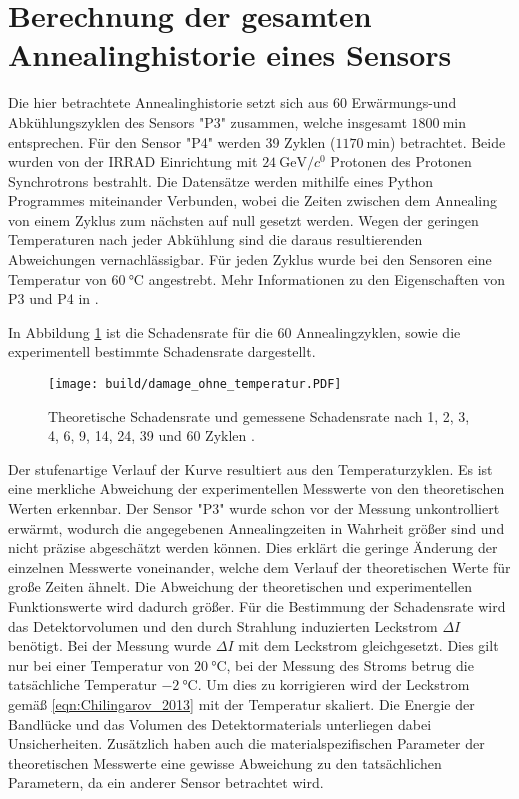 \section{Berechnung der gesamten Annealinghistorie eines Sensors}
Die hier betrachtete Annealinghistorie setzt sich aus 60 Erwärmungs-und
Abkühlungszyklen des Sensors "P3" zusammen, welche insgesamt $\SI{1800}{\minute}$ entsprechen.
Für den Sensor "P4" werden 39 Zyklen ($\SI{1170}{\minute}$) betrachtet.
Beide wurden von der ${\mathrm{IRRAD}}$ Einrichtung mit $\SI{24}{\giga\eV\per\clight}$ Protonen des Protonen Synchrotrons bestrahlt.
Die Datensätze werden mithilfe eines Python Programmes miteinander Verbunden,
wobei die Zeiten zwischen dem Annealing von einem Zyklus zum nächsten auf null gesetzt werden. Wegen der geringen
Temperaturen nach jeder Abkühlung sind die daraus resultierenden Abweichungen vernachlässigbar.
Für jeden Zyklus wurde bei den Sensoren eine Temperatur von $\SI{60}{\celsius}$ angestrebt.
Mehr Informationen zu den Eigenschaften von P3 und P4 in  \cite{felix}.


In Abbildung \ref{fig:P_3} ist die Schadensrate für die 60 Annealingzyklen,
sowie die experimentell bestimmte Schadensrate dargestellt.

\begin{figure}
  \centering
    \texttt{[image: build/damage\_ohne\_temperatur.PDF]}
\caption{Theoretische Schadensrate und gemessene Schadensrate nach 1, 2, 3, 4, 6, 9, 14, 24, 39 und 60 Zyklen .}
\label{fig:P_3}
\end{figure}

Der stufenartige Verlauf der Kurve resultiert aus den Temperaturzyklen.
Es ist eine merkliche Abweichung der experimentellen Messwerte von den theoretischen
Werten erkennbar. Der Sensor "P3" wurde schon vor der Messung unkontrolliert erwärmt, wodurch
die angegebenen Annealingzeiten in Wahrheit größer sind und nicht präzise abgeschätzt werden können. Dies erklärt die
geringe Änderung der einzelnen Messwerte voneinander, welche dem
Verlauf der theoretischen Werte für große Zeiten ähnelt. Die Abweichung der theoretischen
und experimentellen Funktionswerte wird dadurch größer.
Für die Bestimmung der Schadensrate wird das Detektorvolumen und den durch
Strahlung induzierten Leckstrom $\Delta I$ benötigt. Bei der Messung wurde
$\Delta I$ mit dem Leckstrom gleichgesetzt. Dies gilt nur bei einer Temperatur
von $\SI{20}{\celsius}$, bei der Messung des Stroms betrug die tatsächliche Temperatur
$\SI{-2}{\celsius}$. Um dies zu korrigieren wird der Leckstrom gemäß \ref{eqn:Chilingarov_2013}
mit der Temperatur skaliert. Die Energie der Bandlücke und das Volumen des Detektormaterials
unterliegen dabei Unsicherheiten. Zusätzlich haben auch die materialspezifischen Parameter
der theoretischen Messwerte eine gewisse Abweichung zu den tatsächlichen Parametern, da
ein anderer Sensor betrachtet wird.

